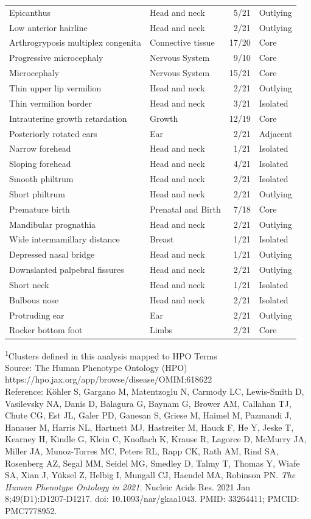 \documentclass[
  letterpaper,
  DIV=11,
  numbers=noendperiod]{scrartcl}
\begin{document}
\begin{longtable}{llrl}
Epicanthus & Head and neck & 5/21 & Outlying \\ 
Low anterior hairline & Head and neck & 2/21 & Outlying \\ 
Arthrogryposis multiplex congenita & Connective tissue & 17/20 & Core \\ 
Progressive microcephaly & Nervous System & 9/10 & Core \\ 
Microcephaly & Nervous System & 15/21 & Core \\ 
Thin upper lip vermilion & Head and neck & 2/21 & Outlying \\ 
Thin vermilion border & Head and neck & 3/21 & Isolated \\ 
Intrauterine growth retardation & Growth & 12/19 & Core \\ 
Posteriorly rotated ears & Ear & 2/21 & Adjacent \\ 
Narrow forehead & Head and neck & 1/21 & Isolated \\ 
Sloping forehead & Head and neck & 4/21 & Isolated \\ 
Smooth philtrum & Head and neck & 2/21 & Isolated \\ 
Short philtrum & Head and neck & 2/21 & Outlying \\ 
Premature birth & Prenatal and Birth & 7/18 & Core \\ 
Mandibular prognathia & Head and neck & 2/21 & Outlying \\ 
Wide intermamillary distance & Breast & 1/21 & Isolated \\ 
Depressed nasal bridge & Head and neck & 1/21 & Outlying \\ 
Downslanted palpebral fissures & Head and neck & 2/21 & Outlying \\ 
Short neck & Head and neck & 1/21 & Isolated \\ 
Bulbous nose & Head and neck & 2/21 & Isolated \\ 
Protruding ear & Ear & 2/21 & Outlying \\ 
Rocker bottom foot & Limbs & 2/21 & Core \\ 
\bottomrule
\end{longtable}
\begin{minipage}{\linewidth}
\textsuperscript{1}Clusters defined in this analysis mapped to HPO Terms\\
Source: The Human Phenotype Ontology (HPO) https://hpo.jax.org/app/browse/disease/OMIM:618622 \\
Reference: Köhler S, Gargano M, Matentzoglu N, Carmody LC, Lewis-Smith D, Vasilevsky NA, Danis D, Balagura G, Baynam G, Brower AM, Callahan TJ, Chute CG, Est JL, Galer PD, Ganesan S, Griese M, Haimel M, Pazmandi J, Hanauer M, Harris NL, Hartnett MJ, Hastreiter M, Hauck F, He Y, Jeske T, Kearney H, Kindle G, Klein C, Knoflach K, Krause R, Lagorce D, McMurry JA, Miller JA, Munoz-Torres MC, Peters RL, Rapp CK, Rath AM, Rind SA, Rosenberg AZ, Segal MM, Seidel MG, Smedley D, Talmy T, Thomas Y, Wiafe SA, Xian J, Yüksel Z, Helbig I, Mungall CJ, Haendel MA, Robinson PN. \emph{The Human Phenotype Ontology in 2021.} Nucleic Acids Res. 2021 Jan 8;49(D1):D1207-D1217. doi: {10.1093/nar/gkaa1043}. PMID: 33264411; PMCID: PMC7778952.\\
\end{minipage}
\end{document}
